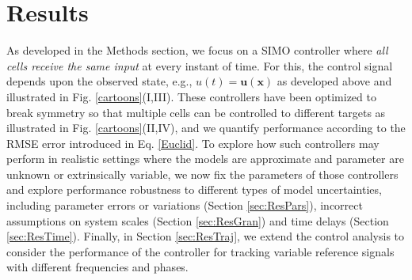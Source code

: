 \documentclass[12pt]{iopart}
\begin{document}
\section{Results}


As developed in the Methods section, we focus on a SIMO controller where {\em all cells receive the same input} at every instant of time. For this, the control signal depends upon the observed state, e.g., $u(t) = \mathbf{u}(\mathbf{x})$ as developed above and illustrated in Fig. \ref{cartoons}(I,III). These controllers have been optimized to break symmetry so that multiple cells can be controlled to different targets as illustrated in Fig. \ref{cartoons}(II,IV), and we quantify performance according to the RMSE error introduced in Eq. \ref{Euclid}. To explore how such controllers may perform in realistic settings where the models are approximate and parameter are unknown or extrinsically variable, we now fix the parameters of those controllers and explore performance robustness to different types of model uncertainties, including parameter errors or variations (Section \ref{sec:ResPars}), incorrect assumptions on system scales (Section \ref{sec:ResGran}) and time delays (Section \ref{sec:ResTime}). Finally, in Section \ref{sec:ResTraj}, we extend the control analysis to consider the performance of the controller for tracking variable reference signals with different frequencies and phases.
\end{document}
